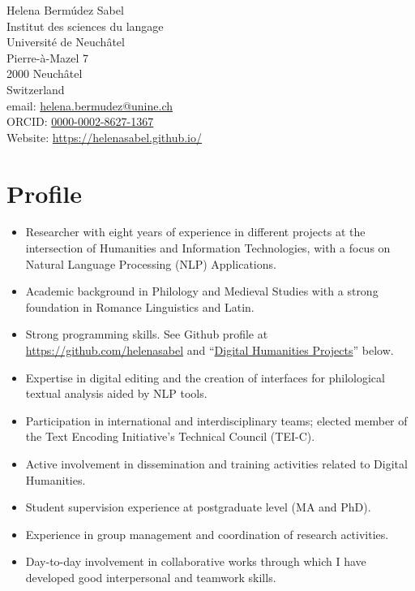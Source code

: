 \documentclass[11pt, a4paper]{article}
\begin{document}
{\LARGE Helena Bermúdez Sabel}\\[1cm]
Institut des sciences du langage\\
Université de Neuchâtel\\Pierre-à-Mazel 7\\2000 Neuchâtel \\ Switzerland\\[.2cm]
email: \href{mailto:helena.bermudez@unine.ch}{helena.bermudez@unine.ch}\\
ORCID: \href{https://orcid.org/0000-0002-8627-1367}{0000-0002-8627-1367}\\
Website: \href{https://helenasabel.github.io/}{https://helenasabel.github.io/} 



\section{Profile}
\begin{itemize}[noitemsep]
 \item Researcher with eight years of experience in different projects at the intersection of Humanities and Information Technologies, with a focus on Natural Language Processing (NLP) Applications.
 \item Academic background in Philology and Medieval Studies with a strong foundation in Romance Linguistics and Latin.
 \item Strong programming skills. See Github profile at \href{https://github.com/helenasabel}{https://github.com/helenasabel} and  “\hyperref[DHprojects]{Digital Humanities Projects}” below.
 \item Expertise in digital editing and the creation of interfaces for philological textual analysis aided by NLP tools.
 \item Participation in international and interdisciplinary teams; elected member of the Text Encoding Initiative's Technical Council (TEI-C).
 \item Active involvement in dissemination and training activities related to Digital Humanities.
 \item Student supervision experience at postgraduate level (MA and PhD).
\item Experience in group management and coordination of research activities.
\item Day-to-day involvement in collaborative works through which I have developed good interpersonal and teamwork skills.
\end{itemize}
\end{document}
